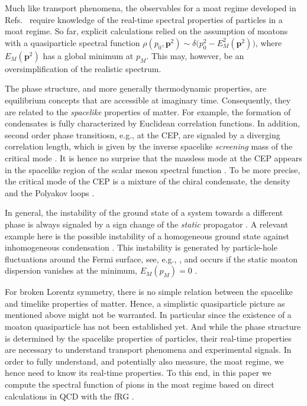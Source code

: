 \documentclass[reprint,english,superscriptaddress,preprintnumbers,amsmath,amssymb,aps,prd,nofootinbib]{revtex4-2}
\newcommand{\bs}[1]{\boldsymbol{#1}}
\begin{document}
Much like transport phenomena, the observables for a moat regime developed in Refs.~\cite{Pisarski:2021qof, Rennecke:2023xhc, Nussinov:2024erh} require knowledge of the real-time spectral properties of particles in a moat regime.
So far, explicit calculations relied on the assumption of moatons with a quasiparticle spectral function $\rho(p_0,\bs{p}^2) \sim \delta\big(p_0^2-E_M^2(\bs{p}^2)\big)$, where $E_M(\bs{p}^2)$ has a global minimum at $p_M$. This may, however, be an oversimplification of the realistic spectrum.



The phase structure, and more generally thermodynamic properties, are equilibrium concepts that are accessible at imaginary time. Consequently, they are related to the \emph{spacelike} properties of matter. For example, the formation of condensates is fully characterized by Euclidean correlation functions. In addition, second order phase transitiosn, e.g., at the CEP, are signaled by a diverging correlation length, which is given by the inverse spacelike \emph{screening} mass of the critical mode \cite{Zinn-Justin:2002ecy}. It is hence no surprise that the massless mode at the CEP appears in the spacelike region of the scalar meson%
spectral function \cite{Fujii:2003bz, Yokota:2016tip}. To be more precise, the critical mode of the CEP is a mixture of the chiral condensate, the density and the Polyakov loops \cite{Haensch:2023sig}.

In general, the instability of the ground state of a system towards a different phase is always signaled by a sign change of the \emph{static} propagator \cite{Weinberg:1987vp}. A relevant example here is the possible instability of a homogeneous ground state against inhomogeneous condensation \cite{Buballa:2014tba}. This instability is generated by particle-hole fluctuations around the Fermi surface, see, e.g., \cite{Jeong:2024rst}, and occurs if the static moaton dispersion vanishes at the minimum, $E_M(p_M) = 0$ \cite{Rennecke:2021ovl}.

For broken Lorentz symmetry, there is no simple relation between the spacelike and timelike properties of matter. Hence, a simplistic quasiparticle picture as mentioned above might not be warranted. In particular since the existence of a moaton quasiparticle has not been established yet.
And while the phase structure is determined by the spacelike properties of particles, their real-time properties are necessary to understand transport phenomena and experimental signals. In order to fully understand, and potentially also measure, the moat regime, we hence need to know its real-time properties. To this end, in this paper we compute the spectral function of pions in the moat regime based on direct calculations in QCD with the fRG \cite{Fu:2019hdw}. 
\end{document}

